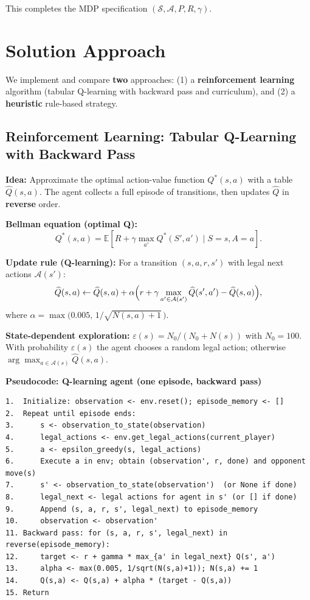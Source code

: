 \documentclass[11pt,a4paper]{article}
\begin{document}
This completes the MDP specification $(\mathcal{S}, \mathcal{A}, P, R, \gamma)$.

\hrulefill

\section{Solution Approach}

We implement and compare \textbf{two} approaches: (1) a \textbf{reinforcement learning} algorithm (tabular Q-learning with backward pass and curriculum), and (2) a \textbf{heuristic} rule-based strategy.

\subsection{Reinforcement Learning: Tabular Q-Learning with Backward Pass}

\textbf{Idea:} Approximate the optimal action-value function $Q^*(s,a)$ with a table $\widehat{Q}(s,a)$. The agent collects a full episode of transitions, then updates $\widehat{Q}$ in \textbf{reverse} order.

\textbf{Bellman equation (optimal Q):}
\[
Q^*(s,a) = \mathbb{E}\left[ R + \gamma \max_{a'} Q^*(S', a') \mid S=s, A=a \right].
\]

\textbf{Update rule (Q-learning):} For a transition $(s, a, r, s')$ with legal next actions $\mathcal{A}(s')$:
\[
\widehat{Q}(s,a) \leftarrow \widehat{Q}(s,a) + \alpha \Bigl( r + \gamma \max_{a' \in \mathcal{A}(s')} \widehat{Q}(s', a') - \widehat{Q}(s,a) \Bigr),
\]
where $\alpha = \max\bigl(0.005,\, 1\big/\sqrt{N(s,a)+1}\,\bigr)$.

\textbf{State-dependent exploration:} $\varepsilon(s) = N_0 \big/ (N_0 + N(s))$ with $N_0 = 100$. With probability $\varepsilon(s)$ the agent chooses a random legal action; otherwise $\arg\max_{a \in \mathcal{A}(s)} \widehat{Q}(s,a)$.

\textbf{Pseudocode: Q-learning agent (one episode, backward pass)}

\begin{lstlisting}
1.  Initialize: observation <- env.reset(); episode_memory <- []
2.  Repeat until episode ends:
3.      s <- observation_to_state(observation)
4.      legal_actions <- env.get_legal_actions(current_player)
5.      a <- epsilon_greedy(s, legal_actions)
6.      Execute a in env; obtain (observation', r, done) and opponent move(s)
7.      s' <- observation_to_state(observation')  (or None if done)
8.      legal_next <- legal actions for agent in s' (or [] if done)
9.      Append (s, a, r, s', legal_next) to episode_memory
10.     observation <- observation'
11. Backward pass: for (s, a, r, s', legal_next) in reverse(episode_memory):
12.     target <- r + gamma * max_{a' in legal_next} Q(s', a')
13.     alpha <- max(0.005, 1/sqrt(N(s,a)+1)); N(s,a) += 1
14.     Q(s,a) <- Q(s,a) + alpha * (target - Q(s,a))
15. Return
\end{lstlisting}
\end{document}
